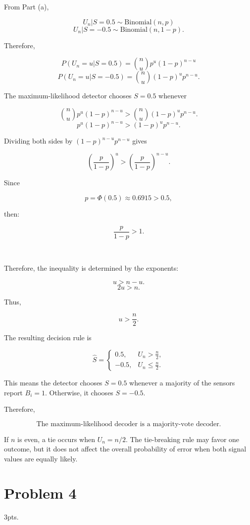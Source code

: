 \documentclass[12pt,a4paper]{article}
\begin{document}
From Part (a),

\[
U_n|S=0.5
\sim
\text{Binomial}(n,p)
\]
\[
U_n|S=-0.5
\sim
\text{Binomial}(n,1-p).
\]

Therefore,

\[
P(U_n=u|S=0.5)
=
\binom{n}{u}
p^u
(1-p)^{n-u}
\]
\[
P(U_n=u|S=-0.5)
=
\binom{n}{u}
(1-p)^u
p^{n-u}.
\]

The maximum-likelihood detector chooses \(S=0.5\) whenever

\[
\binom{n}{u}
p^u
(1-p)^{n-u}
>
\binom{n}{u}
(1-p)^u
p^{n-u}.
\]
\[
p^u(1-p)^{n-u}
>
(1-p)^u p^{n-u}.
\]

Dividing both sides by
\((1-p)^{n-u}p^{n-u}\)
gives

\[
\left(
\frac{p}{1-p}
\right)^u
>
\left(
\frac{p}{1-p}
\right)^{n-u}.
\]

Since

\[
p=\Phi(0.5)\approx0.6915>0.5,
\]

then: 

\[
\frac{p}{1-p}>1.
\]

\

Therefore, the inequality is determined by the exponents:

\[
u>n-u.
\]
\[
2u>n.
\]

Thus,

\[
u>\frac{n}{2}.
\]

The resulting decision rule is

\[
\hat{S}=
\begin{cases}
0.5, & U_n>\frac{n}{2},\\
-0.5, & U_n\leq\frac{n}{2}.
\end{cases}
\]

This means the detector chooses \(S=0.5\) whenever a majority of the sensors report \(B_i=1\). Otherwise, it chooses \(S=-0.5\).

Therefore,

\[
\boxed{\text{The maximum-likelihood decoder is a majority-vote decoder.}}
\]

If \(n\) is even, a tie occurs when \(U_n=n/2\). The tie-breaking rule may favor one outcome, but it does not affect the overall probability of error when both signal values are equally likely.\\
\clearpage

\section{Problem 4}
3pts.\\
\end{document}
